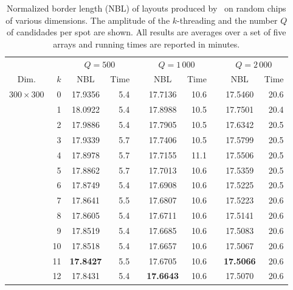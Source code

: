 \begin{table}[p!]\centering
\caption{\label{tab:greedyplus_nbl}
  Normalized border length (NBL) of layouts produced by \Greedyplus\ on random
  chips of various dimensions. The amplitude of the $k$-threading and the number
  $Q$ of candidades per spot are shown. All results are averages over a set of
  five arrays and running times are reported in minutes.}
\footnotesize{
\begin{tabular}{crcrlcrlcr}
\vspace{1pt}
     &     & \multicolumn{2}{c}{$Q=500$} & & \multicolumn{2}{c}{$Q=1\,000$} & & \multicolumn{2}{c}{$Q=2\,000$} \\ \cline{3-4} \cline{6-7} \cline{9-10}
\vspace{1pt}
Dim. & $k$ & NBL & Time & & NBL & Time & & NBL & Time \\
\hline
$300\times 300$ &  0 &      17.9356  &  5.4 &  &      17.7136  & 10.6 &  &      17.5460  &  20.6 \\
                &  1 &      18.0922  &  5.4 &  &      17.8988  & 10.5 &  &      17.7501  &  20.4 \\
                &  2 &      17.9886  &  5.4 &  &      17.7905  & 10.5 &  &      17.6342  &  20.5 \\
                &  3 &      17.9339  &  5.7 &  &      17.7406  & 10.5 &  &      17.5799  &  20.5 \\
                &  4 &      17.8978  &  5.7 &  &      17.7155  & 11.1 &  &      17.5506  &  20.5 \\
                &  5 &      17.8862  &  5.7 &  &      17.7013  & 10.6 &  &      17.5359  &  20.5 \\
                &  6 &      17.8749  &  5.4 &  &      17.6908  & 10.6 &  &      17.5225  &  20.5 \\
                &  7 &      17.8641  &  5.5 &  &      17.6807  & 10.6 &  &      17.5223  &  20.6 \\
                &  8 &      17.8605  &  5.4 &  &      17.6711  & 10.6 &  &      17.5141  &  20.6 \\
                &  9 &      17.8519  &  5.4 &  &      17.6685  & 10.6 &  &      17.5083  &  20.6 \\
                & 10 &      17.8518  &  5.4 &  &      17.6657  & 10.6 &  &      17.5067  &  20.6 \\
                & 11 & {\bf 17.8427} &  5.5 &  &      17.6705  & 10.6 &  & {\bf 17.5066} &  20.6 \\
                & 12 &      17.8431  &  5.4 &  & {\bf 17.6643} & 10.6 &  &      17.5070  &  20.6 \\

\end{tabular}}
\end{table}
